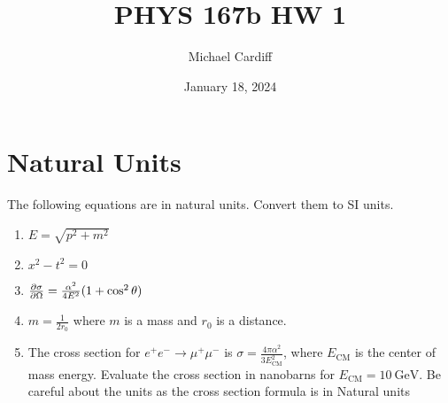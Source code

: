 \documentclass[12pt]{article}
\title{\vspace{-3em}PHYS 167b HW 1}
\author{Michael Cardiff}
\date{January 18, 2024}
\begin{document}
\maketitle

\section{Natural Units}
\begin{problem}
  The following equations are in natural units. Convert them to SI units.
  \begin{enumerate}[label = (\alph*)]
  \item $E=\sqrt{p^2+m^2}$
  \item $x^2-t^2=0$
  \item $\pdv{\sigma}{\Omega}=\frac{\alpha^2}{4E^2}(1+\cos^2\theta)$
  \item $m=\frac1{2r_0}$ where $m$ is a mass and $r_0$ is a distance.
  \item The cross section for $e^+e^-\to\mu^+\mu^-$ is $\sigma=\frac{4\pi\alpha^2}{3E_{\text{CM}}^2}$, where $E_{\text{CM}}$ is the center of mass energy. Evaluate the cross section in nanobarns for $E_{\text{CM}}=\SI{10}{\GeV}$. Be careful about the units as the cross section formula is in Natural units
  \end{enumerate}
\end{problem}
\end{document}
